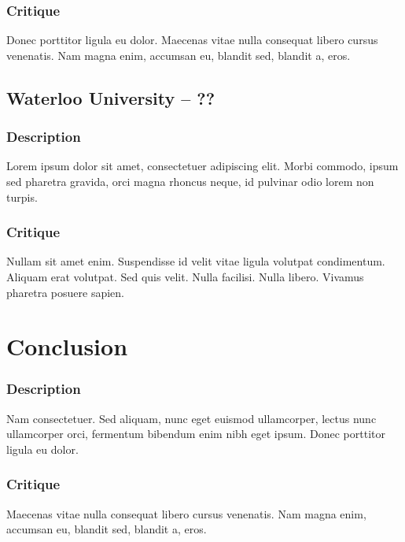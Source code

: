 \documentclass[10pt]{article}
\begin{document}
\begin{multicols}{2}
\subsubsection*{Critique}
Donec porttitor ligula eu dolor. Maecenas vitae nulla consequat libero cursus venenatis. Nam magna enim, accumsan eu, blandit sed, blandit a, eros.

\subsection*{Waterloo University -- ??}
\subsubsection*{Description}
Lorem ipsum dolor sit amet, consectetuer adipiscing elit. Morbi commodo, ipsum sed pharetra gravida, orci magna rhoncus neque, id pulvinar odio lorem non turpis. 

\subsubsection*{Critique}
Nullam sit amet enim. Suspendisse id velit vitae ligula volutpat condimentum. Aliquam erat volutpat. Sed quis velit. Nulla facilisi. Nulla libero. Vivamus pharetra posuere sapien. 

\section*{Conclusion}
\subsubsection*{Description}
Nam consectetuer. Sed aliquam, nunc eget euismod ullamcorper, lectus nunc ullamcorper orci, fermentum bibendum enim nibh eget ipsum. Donec porttitor ligula eu dolor. 

\subsubsection*{Critique}
Maecenas vitae nulla consequat libero cursus venenatis. Nam magna enim, accumsan eu, blandit sed, blandit a, eros.

\end{multicols}

\newpage
\end{document}
